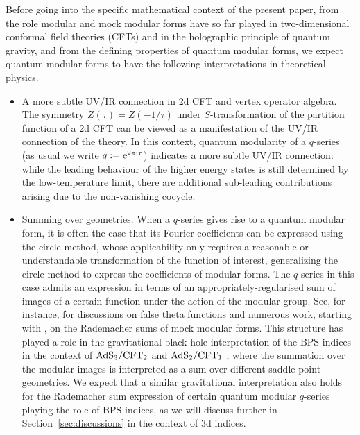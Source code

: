 \documentclass[10pt,a4paper]{amsart}
\theoremstyle{definition}
\numberwithin{equation}{section}
\begin{document}
Before going into the specific mathematical context of the present paper, from the role modular and mock modular forms have so far played in two-dimensional conformal field theories (CFTs) and in the holographic principle of quantum gravity, and from the defining properties of quantum modular forms, we expect quantum modular forms to have the following interpretations in theoretical physics.
 \begin{itemize}\itemsep=0pt
\item{A more subtle UV/IR connection in 2d CFT and vertex operator algebra. }
The symmetry $Z(\tau)=Z(-1/\tau)$ under $S$-transformation of the partition function of a 2d CFT can be viewed as a manifestation of the UV/IR connection of the theory. In this context, quantum modularity of a $q$-series \big(as usual we write $q:={\rm e}^{2\pi {\rm i} \tau}$\big) indicates a more subtle UV/IR connection: while the leading behaviour of the higher energy states is still determined by the low-temperature limit, there are additional sub-leading contributions arising due to the non-vanishing cocycle.
\item{Summing over geometries.} When a $q$-series gives rise to a quantum modular form, it is often the case that its Fourier coefficients can be expressed using the circle method, whose applicability only requires a reasonable or understandable transformation of the function of interest, generalizing the circle method to express the coefficients of modular forms.
The $q$-series in this case admits an expression in terms of an appropriately-regularised sum of images of a certain function under the action of the modular group. See, for instance, \cite{Bringmann:2021wuk, Bringmann:2019vyd, Cheng:2012qc} for discussions on false theta functions and numerous work, starting with \cite{10.2307/1997003},
on the Rademacher sums of mock modular forms.
This structure has played a role in the gravitational black hole interpretation of the BPS indices in the context of ${\rm AdS}_3/{\rm CFT}_2$ \cite{deBoer:2006vg, Denef:2007vg,Dijkgraaf:2000fq,Maldacena:1998bw} and ${\rm AdS}_2/{\rm CFT}_1$ \cite{Dabholkar:2014ema, Ferrari:2017msn,Murthy:2009dq}, where the summation over the modular images is interpreted as a sum over different saddle point geometries.
We expect that a similar gravitational interpretation also holds for the Rademacher sum expression of certain quantum modular $q$-series playing the role of BPS indices, as we will discuss further in Section~\ref{sec:discussions} in the context of 3d indices.
\end{itemize}
\end{document}
